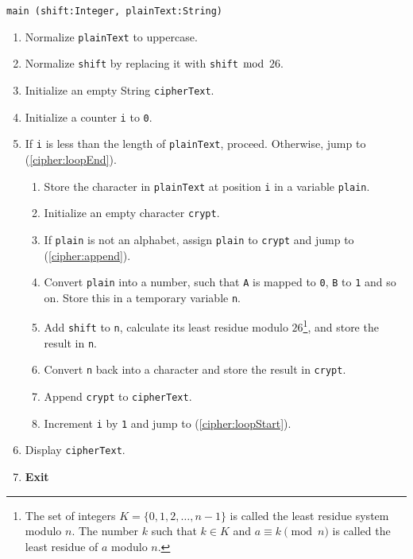 \algorithm
{\tt main (shift:Integer, plainText:String)}
\begin{enumerate}
	\item	Normalize {\tt plainText} to uppercase.
	\item	Normalize {\tt shift} by replacing it with {\tt shift} $\bmod$ $26$.
	\item	Initialize an empty String {\tt cipherText}.
	\item	Initialize a counter {\tt i} to {\tt 0}.
	\item	If {\tt i} is less than the length of {\tt plainText}, proceed.
			Otherwise, jump to (\ref{cipher:loopEnd}). \label{cipher:loopStart}
	\begin{enumerate}
		\item	Store the character in {\tt plainText} at position {\tt i} in a variable {\tt plain}.
		\item	Initialize an empty character {\tt crypt}.
		\item	If {\tt plain} is not an alphabet, assign {\tt plain} to {\tt crypt} and jump to (\ref{cipher:append}).
		\item	Convert {\tt plain} into a number, such that {\tt A} is mapped to {\tt 0}, {\tt B} to {\tt 1} and so on.
				Store this in a temporary variable {\tt n}.
		\item	Add {\tt shift} to {\tt n}, calculate its least residue modulo $26$\footnote{The set of integers 
				$K = \{0, 1, 2, \dots , n-1\}$ is called the least residue system modulo $n$. The number $k$ such that 
				$k \in K$ and $a \equiv k \pmod{n}$ is called the least residue of $a$ modulo $n$.}, and store the result in {\tt n}.
		\item	Convert {\tt n} back into a character and store the result in {\tt crypt}.
		\item	Append {\tt crypt} to {\tt cipherText}.  \label{cipher:append}
		\item	Increment {\tt i} by {\tt 1} and jump to (\ref{cipher:loopStart}).
	\end{enumerate}
	\item	Display {\tt cipherText}.  \label{cipher:loopEnd}
	\item	{\bf Exit}
\end{enumerate}

\sourcecode


